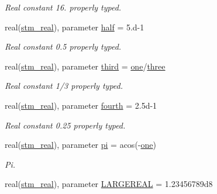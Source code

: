\begin{CompactItemize}
\begin{CompactList}\small\item\em Real constant 16. properly typed. \item\end{CompactList}\item 
\hypertarget{a00071_4dfa5bde79f91f2ed6cba8f824c244f8}{
real(\hyperlink{a00071_be430a25ddbcfe29c5bd13189b85de5d}{stm\_\-real}), parameter \hyperlink{a00071_4dfa5bde79f91f2ed6cba8f824c244f8}{half} = 5.d-1}
\label{a00071_4dfa5bde79f91f2ed6cba8f824c244f8}

\begin{CompactList}\small\item\em Real constant 0.5 properly typed. \item\end{CompactList}\item 
\hypertarget{a00071_bab6661873e03db74c5d8709ea467069}{
real(\hyperlink{a00071_be430a25ddbcfe29c5bd13189b85de5d}{stm\_\-real}), parameter \hyperlink{a00071_bab6661873e03db74c5d8709ea467069}{third} = \hyperlink{a00071_146bdef5e9c346a5d4afbdc679f358c8}{one}/\hyperlink{a00071_3cbcb125934c6a5149a0bedd29ed8933}{three}}
\label{a00071_bab6661873e03db74c5d8709ea467069}

\begin{CompactList}\small\item\em Real constant 1/3 properly typed. \item\end{CompactList}\item 
\hypertarget{a00071_71bc2fcb667a34bf252670f3442e7247}{
real(\hyperlink{a00071_be430a25ddbcfe29c5bd13189b85de5d}{stm\_\-real}), parameter \hyperlink{a00071_71bc2fcb667a34bf252670f3442e7247}{fourth} = 2.5d-1}
\label{a00071_71bc2fcb667a34bf252670f3442e7247}

\begin{CompactList}\small\item\em Real constant 0.25 properly typed. \item\end{CompactList}\item 
\hypertarget{a00071_010a6a2de38bfe944a5adfbac56adc53}{
real(\hyperlink{a00071_be430a25ddbcfe29c5bd13189b85de5d}{stm\_\-real}), parameter \hyperlink{a00071_010a6a2de38bfe944a5adfbac56adc53}{pi} = acos(-\hyperlink{a00071_146bdef5e9c346a5d4afbdc679f358c8}{one})}
\label{a00071_010a6a2de38bfe944a5adfbac56adc53}

\begin{CompactList}\small\item\em Pi. \item\end{CompactList}\item 
\hypertarget{a00071_153df22f66e0cac495dc2b088c90c84c}{
real(\hyperlink{a00071_be430a25ddbcfe29c5bd13189b85de5d}{stm\_\-real}), parameter \hyperlink{a00071_153df22f66e0cac495dc2b088c90c84c}{LARGEREAL} = 1.23456789d8}
\label{a00071_153df22f66e0cac495dc2b088c90c84c}


\end{CompactItemize}
